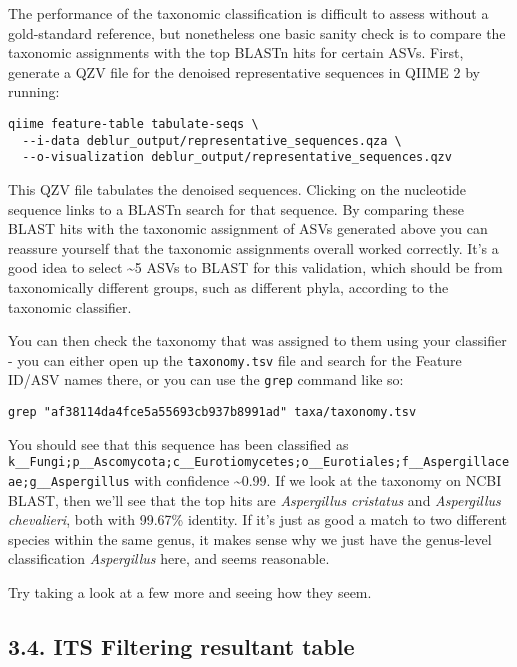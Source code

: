 \documentclass[
]{book}
\begin{document}
The performance of the taxonomic classification is difficult to assess without a gold-standard reference, but nonetheless one basic sanity check is to compare the taxonomic assignments with the top BLASTn hits for certain ASVs. First, generate a QZV file for the denoised representative sequences in QIIME 2 by running:

\begin{verbatim}
qiime feature-table tabulate-seqs \
  --i-data deblur_output/representative_sequences.qza \
  --o-visualization deblur_output/representative_sequences.qzv
\end{verbatim}

This QZV file tabulates the denoised sequences. Clicking on the nucleotide sequence links to a BLASTn search for that sequence. By comparing these BLAST hits with the taxonomic assignment of ASVs generated above you can reassure yourself that the taxonomic assignments overall worked correctly. It's a good idea to select \textasciitilde5 ASVs to BLAST for this validation, which should be from taxonomically different groups, such as different phyla, according to the taxonomic classifier.

You can then check the taxonomy that was assigned to them using your classifier - you can either open up the \texttt{taxonomy.tsv} file and search for the Feature ID/ASV names there, or you can use the \texttt{grep} command like so:

\begin{verbatim}
grep "af38114da4fce5a55693cb937b8991ad" taxa/taxonomy.tsv
\end{verbatim}

You should see that this sequence has been classified as \texttt{k\_\_Fungi;p\_\_Ascomycota;c\_\_Eurotiomycetes;o\_\_Eurotiales;f\_\_Aspergillaceae;g\_\_Aspergillus} with confidence \textasciitilde0.99. If we look at the taxonomy on NCBI BLAST, then we'll see that the top hits are \emph{Aspergillus cristatus} and \emph{Aspergillus chevalieri}, both with 99.67\% identity. If it's just as good a match to two different species within the same genus, it makes sense why we just have the genus-level classification \emph{Aspergillus} here, and seems reasonable.

Try taking a look at a few more and seeing how they seem.

\subsection{3.4. ITS Filtering resultant table}\label{its-filtering-resultant-table}
\end{document}
